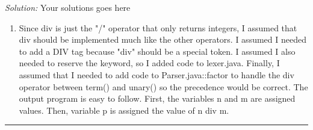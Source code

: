 \documentclass[a4paper, 11pt]{article}
\newenvironment{solution}
    {\textit{Solution:}}
    {}
\begin{document}
\begin{solution}
    Your solutions goes here
    \begin{enumerate}[a]
        \item  Since div is just the "/" operator that only returns integers, I assumed that div should be implemented much like the other operators. I assumed I needed to add a DIV tag
              because "div" should be a special token. I assumed I also needed to reserve the keyword, so I added code to lexer.java. Finally, I assumed that I needed to add code to Parser.java::factor to handle the div operator
              between term() and unary() so the precedence would be correct.
              The output program is easy to follow. First, the variables n and m are assigned values. Then, variable p is assigned the value of n div m. 
    \end{enumerate}
\end{solution}
\noindent\rule{7in}{2.8pt}

\end{document}
